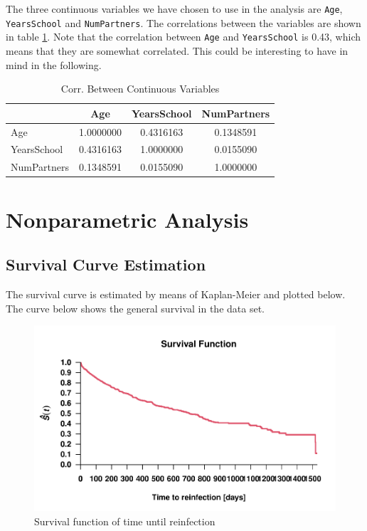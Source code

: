 \documentclass[
]{article}
\begin{document}
The three continuous variables we have chosen to use in the analysis are \texttt{Age}, \texttt{YearsSchool} and \texttt{NumPartners}. The correlations between the variables are shown in table \ref{tab:correlations}. Note that the correlation between \texttt{Age} and \texttt{YearsSchool} is 0.43, which means that they are somewhat correlated. This could be interesting to have in mind in the following.

\begin{table}

\caption{\label{tab:correlations}Corr. Between Continuous Variables}
\centering
\begin{tabular}[t]{l|c|c|c}
\hline
  & Age & YearsSchool & NumPartners\\
\hline
Age & 1.0000000 & 0.4316163 & 0.1348591\\
\hline
YearsSchool & 0.4316163 & 1.0000000 & 0.0155090\\
\hline
NumPartners & 0.1348591 & 0.0155090 & 1.0000000\\
\hline
\end{tabular}
\end{table}

\hypertarget{nonparametric-analysis}{%
\section{Nonparametric Analysis}\label{nonparametric-analysis}}

\hypertarget{survival-curve-estimation}{%
\subsection{Survival Curve Estimation}\label{survival-curve-estimation}}

The survival curve is estimated by means of Kaplan-Meier and plotted below. The curve below shows the general survival in the data set.

\begin{figure}
\centering
\includegraphics{practical_files/figure-latex/survivalf-1.pdf}
\caption{\label{fig:survivalf}Survival function of time until reinfection}
\end{figure}
\end{document}
